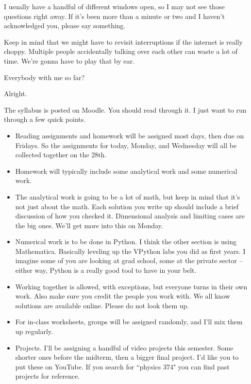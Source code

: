 \documentclass[10pt]{article}
\begin{document}
I usually have a handful of different windows open, so I may not see those questions right away. If it's been more than a minute or two and I haven't acknowledged you, please say something. 

Keep in mind that we might have to revisit interruptions if the internet is really choppy. Multiple people accidentally talking over each other can waste a lot of time. We're gonna have to play that by ear. 

Everybody with me so far?

Alright. 

The syllabus is posted on Moodle. You should read through it. I just want to run through a few quick points. 

\begin{itemize}

    \item Reading assignments and homework will be assigned most days, then due on Fridays. So the assignments for today, Monday, and Wednesday will all be collected together on the 28th.

    \item Homework will typically include some analytical work and some numerical work.
    
    \item The analytical work is going to be a lot of math, but keep in mind that it's not just about the math. Each solution you write up should include a brief discussion of how you checked it. Dimensional analysis and limiting cases are the big ones. We'll get more into this on Monday. 
    
    \item Numerical work is to be done in Python. I think the other section is using Mathematica. Basically leveling up the VPython labs you did as first years. I imagine some of you are looking at grad school, some at the private sector -- either way, Python is a really good tool to have in your belt. 
    
    \item Working together is allowed, with exceptions, but everyone turns in their own work. Also make sure you credit the people you work with. We all know solutions are available online. Please do not look them up.

    \item For in-class worksheets, groups will be assigned randomly, and I'll mix them up regularly. 
    
    \item Projects. I'll be assigning a handful of video projects this semester. Some shorter ones before the midterm, then a bigger final project. I'd like you to put these on YouTube. If you search for ``physics 374" you can find past projects for reference. 

\end{itemize}
\end{document}
